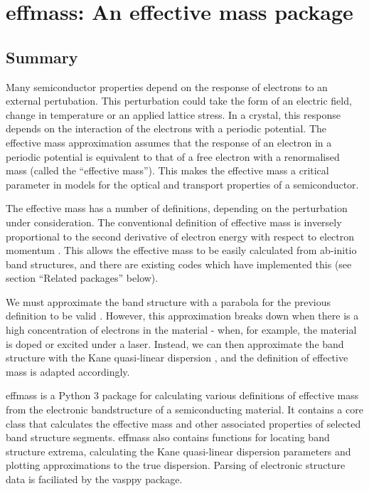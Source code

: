 \chapter{\label{app:1-effmass}effmass: An effective mass package}

\section{Summary}
\label{sec:summary}

Many semiconductor properties depend on the response of electrons to an external pertubation. This perturbation could take the form of an electric field, change in temperature or an applied lattice stress. In a crystal, this response depends on the interaction of the electrons with a periodic potential. The effective mass approximation assumes that the response of an electron in a periodic potential is equivalent to that of a free electron with a renormalised mass (called the ``effective mass''). This makes the effective mass a critical parameter in models for the optical and transport properties of a semiconductor.

The effective mass has a number of definitions, depending on the perturbation under consideration. The conventional definition of effective mass is inversely proportional to the second derivative of electron energy with respect to electron momentum \autocite[p.~227]{Ashcroft1976}. This allows the effective mass to be easily calculated from ab-initio band structures, and there are existing codes which have implemented this (see section ``Related packages'' below).

We must approximate the band structure with a parabola for the previous definition to be valid \autocite{Ariel2012}. However, this approximation breaks down when there is a high concentration of electrons in the material - when, for example, the material is doped or excited under a laser. Instead, we can then approximate the band structure with the Kane quasi-linear dispersion \autocite{Kane1957}, and the definition of effective mass is adapted accordingly.

effmass \autocite{Whalley2018b} is a Python 3 package for calculating various definitions of effective mass from the electronic bandstructure of a semiconducting material. It contains a core class that calculates the effective mass and other associated properties of selected band structure segments. effmass also contains functions for locating band structure extrema, calculating the Kane quasi-linear dispersion parameters and plotting approximations to the true dispersion. Parsing of electronic structure data is faciliated by the vasppy \autocite{Morgan2018} package.

